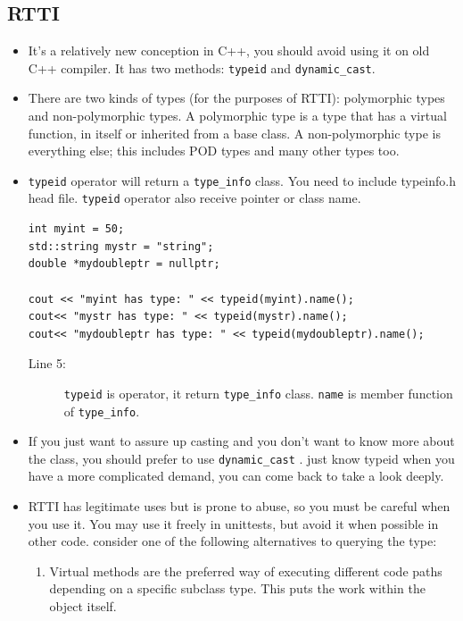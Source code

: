 \documentclass[a4paper,11pt,twoside]{book}
\begin{document}
\subsection{RTTI}
\begin{itemize}
	\item It's a relatively new conception in C++, you should avoid using it on old C++ compiler. It has two methods: \texttt{typeid} and \texttt{dynamic\_cast}.
	
	\item There are two kinds of types (for the purposes of RTTI): polymorphic types and non-polymorphic types. A polymorphic type is a type that has a virtual function, in itself or inherited from a base class. A non-polymorphic type is everything else; this includes POD types and many other types too.
	
	\item \texttt{typeid} operator will return a \texttt{type\_info} class.  You need to include typeinfo.h head file. \texttt{typeid} operator also receive pointer or class name.
	
\begin{lstlisting}
int myint = 50;
std::string mystr = "string";
double *mydoubleptr = nullptr;
	
cout << "myint has type: " << typeid(myint).name();
cout<< "mystr has type: " << typeid(mystr).name();
cout<< "mydoubleptr has type: " << typeid(mydoubleptr).name();
\end{lstlisting}
\begin{description}
	\item[Line 5:] \texttt{typeid} is operator, it return \texttt{type\_info} class. \texttt{name} is member function of \texttt{type\_info}.
\end{description}

	\item If you just want to assure up casting and you don't want to know more about the class, you should prefer to use \texttt{dynamic\_cast} . just know typeid when you have a more complicated demand, you can come back to take a look deeply.
	
	\item RTTI has legitimate uses but is prone to abuse, so you must be careful when you use it. You may use it freely in unittests, but avoid it when possible in other code. consider one of the following alternatives to querying the type:
	\begin{enumerate}
		\item Virtual methods are the preferred way of executing different code paths depending on a specific subclass type. This puts the work within the object itself.
		

\end{enumerate}
\end{itemize}
\end{document}
